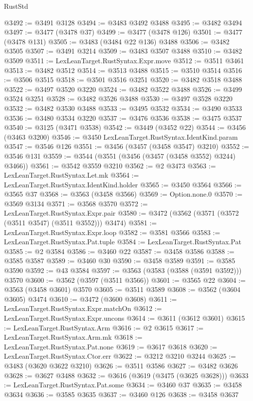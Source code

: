 \begin{lexlean}{RustStd}
\begin{coremodule}
@3492 := @3491 @3128
@3494 := @3483 @3492 @3488
@3495 := @3482 @3494
@3497 := @3477 (@3478 @37)
@3499 := @3477 (@3478 @126)
@3501 := @3477 (@3478 @131)
@3505 := @3483 (@3484 @22 @136) @3488
@3506 := @3482 @3505
@3507 := @3491 @3214
@3509 := @3483 @3507 @3488
@3510 := @3482 @3509
@3511 := LexLeanTarget.RustSyntax.Expr.move
@3512 := @3511 @3461
@3513 := @3482 @3512
@3514 := @3513 @3488
@3515 := @3510 @3514
@3516 := @3506 @3515
@3518 := @3501 @3516 @3251
@3520 := @3482 @3518 @3488
@3522 := @3497 @3520 @3220
@3524 := @3482 @3522 @3488
@3526 := @3499 @3524 @3251
@3528 := @3482 @3526 @3488
@3530 := @3497 @3528 @3220
@3532 := @3482 @3530 @3488
@3533 := @3495 @3532
@3534 := @3490 @3533
@3536 := @3480 @3534 @3220
@3537 := @3476 @3536
@3538 := @3475 @3537
@3540 := @3125 (@3471 @3538)
@3542 := @3449 (@3452 @22)
@3544 := @3456 (@3463 @3200)
@3546 := @3450 LexLeanTarget.RustSyntax.IdentKind.param
@3547 := @3546 @126
@3551 := @3456 (@3457 (@3458 @3547) @3210)
@3552 := @3546 @131
@3559 := @3544 (@3551 (@3456 (@3457 (@3458 @3552) @3244) @3466))
@3561 := @3542 @3559 @3210
@3562 := @2 @3473
@3563 := LexLeanTarget.RustSyntax.Let.mk
@3564 := LexLeanTarget.RustSyntax.IdentKind.holder
@3565 := @3450 @3564
@3566 := @3565 @37
@3568 := @3563 (@3458 @3566)
@3569 := Option.none.{0}
@3570 := @3569 @3134
@3571 := @3568 @3570
@3572 := LexLeanTarget.RustSyntax.Expr.pair
@3580 := @3472 (@3562 (@3571 (@3572 (@3511 @3547) (@3511 @3552))) @3474)
@3581 := LexLeanTarget.RustSyntax.Expr.loop
@3582 := @3581 @3566
@3583 := LexLeanTarget.RustSyntax.Pat.tuple
@3584 := LexLeanTarget.RustSyntax.Pat
@3585 := @2 @3584
@3586 := @3460 @22
@3587 := @3458 @3586
@3588 := @3585 @3587
@3589 := @3460 @30
@3590 := @3458 @3589
@3591 := @3585 @3590
@3592 := @43 @3584
@3597 := @3563 (@3583 (@3588 (@3591 @3592))) @3570
@3600 := @3562 (@3597 (@3511 @3566))
@3601 := @3565 @22
@3604 := @3563 (@3458 @3601) @3570
@3605 := @3511 @3589
@3608 := @3562 (@3604 @3605) @3474
@3610 := @3472 (@3600 @3608)
@3611 := LexLeanTarget.RustSyntax.Expr.matchOn
@3612 := LexLeanTarget.RustSyntax.Expr.uncons
@3614 := @3611 (@3612 @3601)
@3615 := LexLeanTarget.RustSyntax.Arm
@3616 := @2 @3615
@3617 := LexLeanTarget.RustSyntax.Arm.mk
@3618 := LexLeanTarget.RustSyntax.Pat.none
@3619 := @3617 @3618
@3620 := LexLeanTarget.RustSyntax.Ctor.err
@3622 := @3212 @3210 @3244
@3625 := @3483 (@3620 @3622 @3210)
@3626 := @3511 @3586
@3627 := @3482 @3626
@3628 := @3627 @3488
@3632 := @3616 (@3619 (@3475 (@3625 @3628)))
@3633 := LexLeanTarget.RustSyntax.Pat.some
@3634 := @3460 @37
@3635 := @3458 @3634
@3636 := @3585 @3635
@3637 := @3460 @126
@3638 := @3458 @3637

\end{coremodule}
\end{lexlean}
